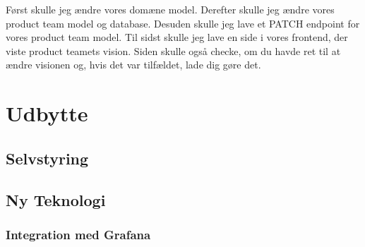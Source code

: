 \documentclass[a4paper]{article}
\begin{document}
Først skulle jeg ændre vores domæne model.
Derefter skulle jeg ændre vores product team model og database.
Desuden skulle jeg lave et PATCH endpoint for vores product team model.
Til sidst skulle jeg lave en side i vores frontend,
der viste product teamets vision.
Siden skulle også checke, om du havde ret til at ændre visionen og,
 hvis det var tilfældet, lade dig gøre det.


\newpage
\section{Udbytte}
\label{udbytte}
\subsection{Selvstyring}
\subsection{Ny Teknologi}
\subsubsection{Integration med Grafana}
\end{document}
